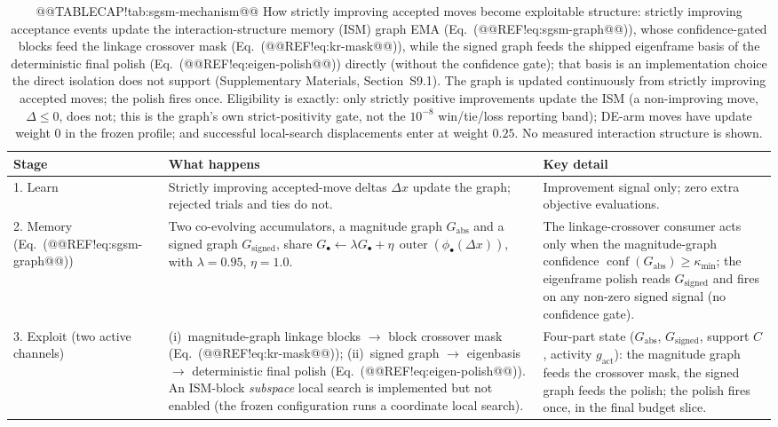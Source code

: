 \documentclass[10pt,a4paper]{article}
\begin{document}
\begin{table}[t]
\caption{@@TABLECAP!tab:sgsm-mechanism@@ How strictly improving accepted moves become exploitable structure:
strictly improving acceptance events update the interaction-structure
memory (ISM) graph EMA (Eq.~(@@REF!eq:sgsm-graph@@)), whose confidence-gated
blocks feed the linkage crossover mask (Eq.~(@@REF!eq:kr-mask@@)), while the
signed graph feeds the shipped eigenframe basis of the deterministic final
polish (Eq.~(@@REF!eq:eigen-polish@@)) directly (without the confidence gate);
that basis is an implementation choice the direct isolation does not
support (Supplementary Materials, Section~S9.1).
The graph is updated continuously from strictly improving accepted moves; the
polish fires once. Eligibility is exactly: only strictly positive improvements
update the ISM (a non-improving move, $\Delta \le 0$, does not; this is the
graph's own strict-positivity gate, not the $10^{-8}$ win/tie/loss reporting
band); DE-arm moves have update weight $0$ in the frozen profile; and
successful local-search displacements enter at weight $0.25$.
No measured interaction structure is shown.}
\label{tab:sgsm-mechanism}
\footnotesize
\begin{tabular}{p{2.4cm}p{7.6cm}p{3.7cm}}
\toprule
\textbf{Stage} & \textbf{What happens} & \textbf{Key detail} \\
\midrule
1. Learn & Strictly improving accepted-move deltas $\Delta x$ update the graph; rejected trials and ties do not. & Improvement signal only; zero extra objective evaluations. \\
2. Memory (Eq.~(@@REF!eq:sgsm-graph@@)) & Two co-evolving accumulators, a magnitude graph $G_{\mathrm{abs}}$ and a signed graph $G_{\mathrm{signed}}$, share $G_\bullet \gets \lambda G_\bullet + \eta\,\operatorname{outer}(\phi_\bullet(\Delta x))$, with $\lambda{=}0.95$, $\eta{=}1.0$. & The linkage-crossover consumer acts only when the magnitude-graph confidence $\operatorname{conf}(G_{\mathrm{abs}})\ge\kappa_{\min}$; the eigenframe polish reads $G_{\mathrm{signed}}$ and fires on any non-zero signed signal (no confidence gate). \\
3. Exploit (two active channels) & (i)~magnitude-graph linkage blocks $\to$ block crossover mask (Eq.~(@@REF!eq:kr-mask@@)); (ii)~signed graph $\to$ eigenbasis $\to$ deterministic final polish (Eq.~(@@REF!eq:eigen-polish@@)). An ISM-block \emph{subspace} local search is implemented but not enabled (the frozen configuration runs a coordinate local search). & Four-part state ($G_{\mathrm{abs}}$, $G_{\mathrm{signed}}$, support $C$, activity $g_{\mathrm{act}}$): the magnitude graph feeds the crossover mask, the signed graph feeds the polish; the polish fires once, in the final budget slice. \\
\bottomrule
\end{tabular}
\end{table}
\end{document}

